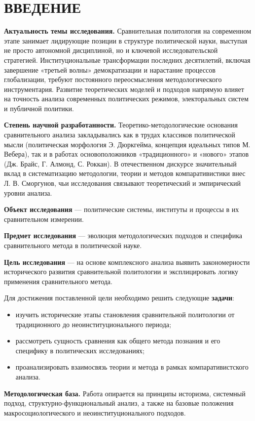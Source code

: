 \section*{ВВЕДЕНИЕ}

\textbf{Актуальность темы исследования.} Сравнительная политология на современном этапе занимает лидирующие позиции в структуре политической науки, выступая не просто автономной дисциплиной, но и ключевой исследовательской стратегией. Институциональные трансформации последних десятилетий, включая завершение «третьей волны» демократизации и нарастание процессов глобализации, требуют постоянного переосмысления методологического инструментария. Развитие теоретических моделей и подходов напрямую влияет на точность анализа современных политических режимов, электоральных систем и публичной политики.

\textbf{Степень научной разработанности.} Теоретико-методологические основания сравнительного анализа закладывались как в трудах классиков политической мысли (политическая морфология Э. Дюркгейма, концепция идеальных типов М. Вебера), так и в работах основоположников «традиционного» и «нового» этапов (Дж. Брайс, Г. Алмонд, С. Роккан). В отечественном дискурсе значительный вклад в систематизацию методологии, теории и методов компаративистики внес Л. В. Сморгунов, чьи исследования связывают теоретический и эмпирический уровни анализа.

\textbf{Объект исследования} --- политические системы, институты и процессы в их сравнительном измерении.

\textbf{Предмет исследования} --- эволюция методологических подходов и специфика сравнительного метода в политической науке.

\textbf{Цель исследования} --- на основе комплексного анализа выявить закономерности исторического развития сравнительной политологии и эксплицировать логику применения сравнительного метода.

Для достижения поставленной цели необходимо решить следующие \textbf{задачи}:
\begin{itemize}
    \item изучить исторические этапы становления сравнительной политологии от традиционного до неоинституционального периода;
    \item рассмотреть сущность сравнения как общего метода познания и его специфику в политических исследованиях;
    \item проанализировать взаимосвязь теории и метода в рамках компаративистского анализа.
\end{itemize}

\textbf{Методологическая база.} Работа опирается на принципы историзма, системный подход, структурно-функциональный анализ, а также на базовые положения макросоциологического и неоинституционального подходов.
